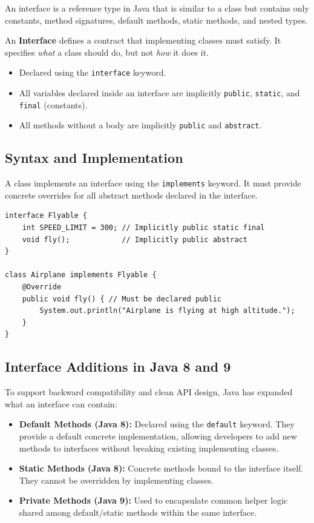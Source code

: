 \documentclass[12pt,a4paper]{article}
\begin{document}
An interface is a reference type in Java that is similar to a class but contains only constants, method signatures, default methods, static methods, and nested types.

\begin{tcolorbox}[defbox, title={\textbf{Interface Concept}}]
An \textbf{Interface} defines a contract that implementing classes must satisfy. It specifies \textit{what} a class should do, but not \textit{how} it does it.
\begin{itemize}[leftmargin=*, itemsep=3pt]
  \item Declared using the \texttt{interface} keyword.
  \item All variables declared inside an interface are implicitly \texttt{public}, \texttt{static}, and \texttt{final} (constants).
  \item All methods without a body are implicitly \texttt{public} and \texttt{abstract}.
\end{itemize}
\end{tcolorbox}

\subsection{Syntax and Implementation}
A class implements an interface using the \texttt{implements} keyword. It must provide concrete overrides for all abstract methods declared in the interface.

\begin{verbatim}
interface Flyable {
    int SPEED_LIMIT = 300; // Implicitly public static final
    void fly();            // Implicitly public abstract
}

class Airplane implements Flyable {
    @Override
    public void fly() { // Must be declared public
        System.out.println("Airplane is flying at high altitude.");
    }
}
\end{verbatim}

\subsection{Interface Additions in Java 8 and 9}
To support backward compatibility and clean API design, Java has expanded what an interface can contain:
\begin{itemize}[leftmargin=*, itemsep=3pt]
  \item \textbf{Default Methods (Java 8):} Declared using the \texttt{default} keyword. They provide a default concrete implementation, allowing developers to add new methods to interfaces without breaking existing implementing classes.
  \item \textbf{Static Methods (Java 8):} Concrete methods bound to the interface itself. They cannot be overridden by implementing classes.
  \item \textbf{Private Methods (Java 9):} Used to encapsulate common helper logic shared among default/static methods within the same interface.
\end{itemize}
\end{document}
